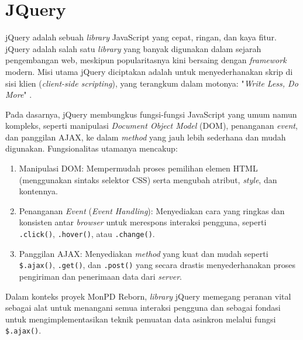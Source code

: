 \section{JQuery}
\label{sec:jquery}

jQuery adalah sebuah \emph{library} JavaScript yang cepat, ringan, dan kaya fitur. jQuery adalah salah satu \emph{library} yang banyak digunakan dalam sejarah pengembangan web, meskipun popularitasnya kini bersaing dengan \emph{framework} modern. Misi utama jQuery diciptakan adalah untuk menyederhanakan skrip di sisi klien (\emph{client-side scripting}), yang terangkum dalam motonya: "\emph{Write Less, Do More}" \cite{jquery_official}.

Pada dasarnya, jQuery membungkus fungsi-fungsi JavaScript yang umum namun kompleks, seperti manipulasi \emph{Document Object Model} (DOM), penanganan \emph{event}, dan panggilan AJAX, ke dalam \emph{method} yang jauh lebih sederhana dan mudah digunakan. Fungsionalitas utamanya mencakup:

\begin{enumerate}
    \item Manipulasi DOM: Mempermudah proses pemilihan elemen HTML (menggunakan sintaks selektor CSS) serta mengubah atribut, \emph{style}, dan kontennya.
    \item Penanganan \emph{Event} (\emph{Event Handling}): Menyediakan cara yang ringkas dan konsisten antar \emph{browser} untuk merespons interaksi pengguna, seperti \texttt{.click()}, \texttt{.hover()}, atau \texttt{.change()}.
    \item Panggilan AJAX: Menyediakan \emph{method} yang kuat dan mudah seperti \texttt{\$.ajax()}, \texttt{.get()}, dan \texttt{.post()} yang secara drastis menyederhanakan proses pengiriman dan penerimaan data dari \emph{server}.
\end{enumerate}

Dalam konteks proyek MonPD Reborn, \emph{library} jQuery memegang peranan vital sebagai alat untuk menangani semua interaksi pengguna dan sebagai fondasi untuk mengimplementasikan teknik pemuatan data asinkron melalui fungsi \texttt{\$.ajax()}.